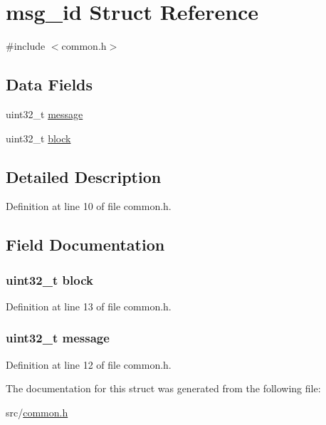 \hypertarget{structmsg__id}{
\section{msg\_\-id Struct Reference}
\label{structmsg__id}
}


{\ttfamily \#include $<$common.h$>$}

\subsection*{Data Fields}
\begin{DoxyCompactItemize}
\item 
uint32\_\-t \hyperlink{structmsg__id_a3839b919be7bfd4639d8e82fb5dd967a}{message}
\item 
uint32\_\-t \hyperlink{structmsg__id_a968f13087959262d4a789e69e985d685}{block}
\end{DoxyCompactItemize}


\subsection{Detailed Description}


Definition at line 10 of file common.h.



\subsection{Field Documentation}
\hypertarget{structmsg__id_a968f13087959262d4a789e69e985d685}{
\subsubsection[{block}]{\setlength{\rightskip}{0pt plus 5cm}uint32\_\-t {\bf block}}}
\label{structmsg__id_a968f13087959262d4a789e69e985d685}


Definition at line 13 of file common.h.

\hypertarget{structmsg__id_a3839b919be7bfd4639d8e82fb5dd967a}{
\subsubsection[{message}]{\setlength{\rightskip}{0pt plus 5cm}uint32\_\-t {\bf message}}}
\label{structmsg__id_a3839b919be7bfd4639d8e82fb5dd967a}


Definition at line 12 of file common.h.



The documentation for this struct was generated from the following file:\begin{DoxyCompactItemize}
\item 
src/\hyperlink{common_8h}{common.h}\end{DoxyCompactItemize}
